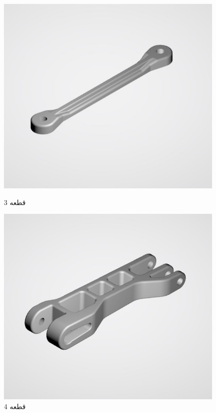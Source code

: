 \documentclass{article}
\begin{document}
\begin{figure}[H]
    \centering
    \begin{minipage}{0.5\linewidth}
        \centering
        \includegraphics[width=0.9\linewidth]{3.JPG}
        \caption{قطعه 3}
        \label{fig:label3}
    \end{minipage}%
    \begin{minipage}{0.5\linewidth}
        \centering
        \includegraphics[width=0.9\linewidth]{4.JPG}
        \caption{قطعه 4}
        \label{fig:label4}
    \end{minipage}
\end{figure}
\end{document}
